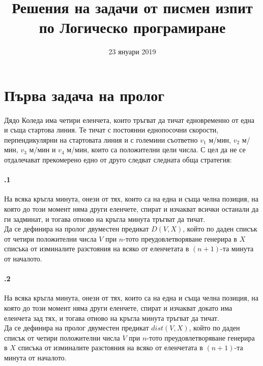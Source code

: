 \documentclass{article}
\title{Решения на задачи от писмен изпит по Логическо програмиране}
\date{23 януари 2019}
\begin{document}


\maketitle %
\newpage
\tableofcontents
\newpage %
\section{Първа задача на пролог}
\paragraph{}
Дядо Коледа има четири еленчета, които тръгват да тичат едновременно от една и съща стартова линия. Те тичат с постоянни еднопосочни скорости, перпендикулярни на стартовата линия и с големини съответно $v_1$ м/мин, $v_2$ м/мин, $v_3$ м/мин и $v_4$ м/мин, които са положителни цели числа. С цел да не се отдалечават прекомерено едно от друго следват следната обща стратегия:\\
\paragraph{\hspace{0.5em} .1} 
\begin{addmargin}[1em]{2em}
На всяка кръгла минута, онези от тях, които са на една и съща челна позиция, на която до този момент няма други еленчете, спират и изчакват всички останали да ги задминат, и тогава отново на кръгла минута тръгват да тичат.\\
Да се дефинира на пролог двуместен предикат $D(V,X)$, който по даден списък от четири положителни числа $V$ при $n$-тото преудовлетворяване генерира в $X$ списъка от изминалите разстояния на всяко от еленчетата в $(n+1)$-та минута от началото.
\end{addmargin}

\vskip 0.2in

\paragraph{\hspace{0.5em} .2} 
\begin{addmargin}[1em]{2em}
На всяка кръгла минута, онези от тях, които са на една и съща челна позиция, на която до този момент няма други еленчете, спират и изчакват докато има еленчета зад тях, и тогава отново на кръгла минута тръгват да тичат.\\
Да се дефинира на пролог двуместен предикат $dist(V,X)$, който по даден списък от четири положителни числа $V$ при $n$-тото преудовлетворяване генерира в $X$ списъка от изминалите разстояния на всяко от еленчетата в $(n+1)$-та минута от началото.
\end{addmargin}
\end{document}

